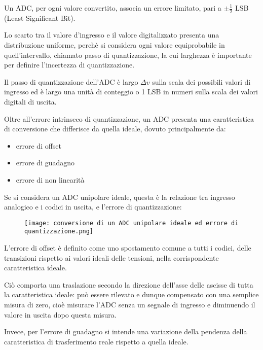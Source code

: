 Un ADC, per ogni valore convertito, associa un errore limitato, pari a $\pm \frac{1}{2}$ LSB (Least Significant  Bit). \newline 

Lo scarto tra il valore d'ingresso e il valore digitalizzato presenta una distribuzione uniforme, perchè si considera ogni valore equiprobabile in quell'intervallo, 
chiamato passo di quantizzazione, 
la cui larghezza è importante per definire l'incertezza di quantizzazione. \newline 

Il passo di quantizzazione dell'ADC è largo $\Delta v$ sulla scala dei possibili valori di ingresso ed è largo una unità di conteggio o 1 LSB in numeri sulla scala dei valori digitali di uscita. \newline 

Oltre all'errore intrinseco di quantizzazione, un ADC presenta una caratteristica di conversione che differisce da quella ideale, 
dovuto principalmente da: 

\begin{itemize}
    \item errore di offset 
    \item errore di guadagno 
    \item errore di non linearità
\end{itemize}

Se si considera un ADC unipolare ideale, questa è la relazione tra ingresso analogico e i codici in uscita, e l'errore di quantizzazione: 

\begin{figure}[h]
    \centering
    \texttt{[image: conversione di un ADC unipolare ideale ed errore di quantizzazione.png]}
\end{figure}

L'errore di offset è definito come uno spostamento comune a tutti i codici, delle transizioni rispetto ai valori ideali delle tensioni, nella corrispondente caratteristica ideale. \newline 

Ciò comporta una traslazione secondo la direzione dell'asse delle ascisse di tutta la caratteristica ideale: 
può essere rilevato e dunque compensato con una semplice misura di zero, cioè misurare l'ADC senza un segnale di ingresso e diminuendo il valore in uscita dopo questa misura. \newline 

Invece, per l'errore di guadagno si intende una variazione della pendenza della caratteristica di trasferimento reale rispetto a quella ideale. \newline 

